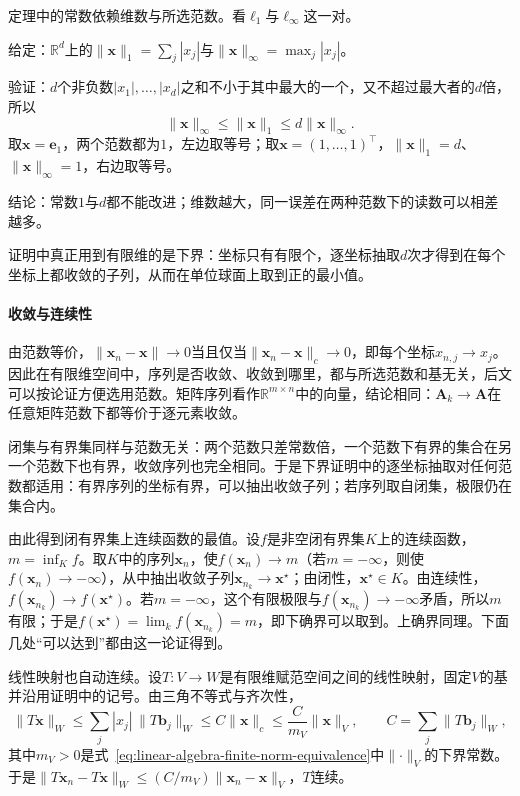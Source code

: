 定理中的常数依赖维数与所选范数。看$\ell_1$与$\ell_\infty$这一对。
\begin{example}
\label{ex:ls-l1-linf-constants}
给定：$\mathbb R^d$上的$\lVert\bm x\rVert_1=\sum_j|x_j|$与$\lVert\bm x\rVert_\infty=\max_j|x_j|$。

验证：$d$个非负数$|x_1|,\ldots,|x_d|$之和不小于其中最大的一个，又不超过最大者的$d$倍，所以
\[
 \lVert\bm x\rVert_\infty\leq\lVert\bm x\rVert_1\leq d\lVert\bm x\rVert_\infty .
\]
取$\bm x=\bm e_1$，两个范数都为$1$，左边取等号；取$\bm x=(1,\ldots,1)^\top$，$\lVert\bm x\rVert_1=d$、$\lVert\bm x\rVert_\infty=1$，右边取等号。

结论：常数$1$与$d$都不能改进；维数越大，同一误差在两种范数下的读数可以相差越多。
\end{example}
证明中真正用到有限维的是下界：坐标只有有限个，逐坐标抽取$d$次才得到在每个坐标上都收敛的子列，从而在单位球面上取到正的最小值。

\paragraph{收敛与连续性}
由范数等价，$\lVert\bm x_n-\bm x\rVert\to0$当且仅当$\lVert\bm x_n-\bm x\rVert_c\to0$，即每个坐标$x_{n,j}\to x_j$。因此在有限维空间中，序列是否收敛、收敛到哪里，都与所选范数和基无关，后文可以按论证方便选用范数。矩阵序列看作$\mathbb R^{m\times n}$中的向量，结论相同：$\bm A_k\to\bm A$在任意矩阵范数下都等价于逐元素收敛。

闭集与有界集同样与范数无关：两个范数只差常数倍，一个范数下有界的集合在另一个范数下也有界，收敛序列也完全相同。于是下界证明中的逐坐标抽取对任何范数都适用：有界序列的坐标有界，可以抽出收敛子列；若序列取自闭集，极限仍在集合内。

由此得到闭有界集上连续函数的最值。设$f$是非空闭有界集$K$上的连续函数，$m=\inf_{K}f$。取$K$中的序列$\bm x_n$，使$f(\bm x_n)\to m$（若$m=-\infty$，则使$f(\bm x_n)\to-\infty$），从中抽出收敛子列$\bm x_{n_k}\to\bm x^\star$；由闭性，$\bm x^\star\in K$。由连续性，$f(\bm x_{n_k})\to f(\bm x^\star)$。若$m=-\infty$，这个有限极限与$f(\bm x_{n_k})\to-\infty$矛盾，所以$m$有限；于是$f(\bm x^\star)=\lim_kf(\bm x_{n_k})=m$，即下确界可以取到。上确界同理。下面几处“可以达到”都由这一论证得到。

线性映射也自动连续。设$T:V\to W$是有限维赋范空间之间的线性映射，固定$V$的基并沿用证明中的记号。由三角不等式与齐次性，
\[
 \lVert T\bm x\rVert_W\leq\sum_j|x_j|\,\lVert T\bm b_j\rVert_W\leq C\lVert\bm x\rVert_c\leq\frac C{m_V}\lVert\bm x\rVert_V,
 \qquad C=\sum_j\lVert T\bm b_j\rVert_W,
\]
其中$m_V>0$是式~\eqref{eq:linear-algebra-finite-norm-equivalence}中$\lVert\cdot\rVert_V$的下界常数。于是$\lVert T\bm x_n-T\bm x\rVert_W\leq(C/m_V)\lVert\bm x_n-\bm x\rVert_V$，$T$连续。

